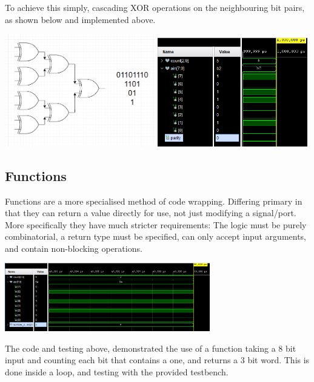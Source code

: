 \documentclass[11pt]{article}
\begin{document}
\begin{preview}
  To achieve this simply, cascading XOR operations on the neighbouring bit pairs, as shown below and implemented above.
  \begin{center}
    \includegraphics[width=0.49\textwidth]{inc/xor.png}
    \includegraphics[width=0.49\textwidth]{inc/3_1_2.PNG}
  \end{center}
  

  \subsection{Functions}
  Functions are a more specialised method of code wrapping. Differing primary in that they can return a value directly for use, not just modifying a signal/port. More specifically they have much stricter requirements:
  The logic must be purely combinatorial, a return type must be specified, can only accept input arguments, and contain non-blocking operations.

  
  \begin{center}
    \includegraphics[width=0.67\textwidth]{inc/3_2_2.PNG}
  \end{center}

  The code and testing above, demonstrated the use of a function taking a 8 bit input and counting each bit that contains a one, and returns a 3 bit word. This is done inside a loop, and testing with the provided testbench.


\end{preview}
\end{document}
